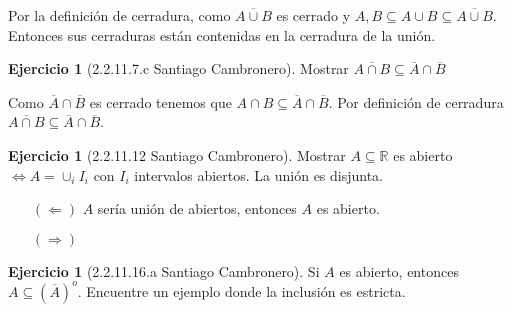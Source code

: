 \documentclass[12pt]{article}
\theoremstyle{plain}
\theoremstyle{definition}
\newtheorem{Ej}[Th]{Ejercicio}
\theoremstyle{remark}
\numberwithin{equation}{section}
\newcommand{\bQ}{\mathbb{Q}}        %
\newcommand{\bR}{\mathbb{R}}        %
\renewcommand{\:}{\colon}           %
\newcommand{\obonj}[1]{\left\rbrack#1\right\lbrack}
\begin{document}
\begin{multicols}{2}
\begin{ptcb}
Por la definición de cerradura, como $\overline{A\cup B}$ es cerrado y $A,B\subseteq A\cup B\subseteq\overline{A\cup B}$. Entonces sus cerraduras están contenidas en la cerradura de la unión.
\end{ptcb}

\begin{Ej}[2.2.11.7.c Santiago Cambronero]
 Mostrar $\overline{A\cap B}\subseteq\overline{A}\cap\overline{B}$
\end{Ej}

\begin{ptcb}
Como $\overline{A}\cap\overline{B}$ es cerrado tenemos que $A\cap B\subseteq \overline{A}\cap\overline{B}$. Por definición de cerradura $\overline{A\cap B}\subseteq\overline{A}\cap\overline{B}$.
\end{ptcb}

\begin{Ej}[2.2.11.12 Santiago Cambronero]
 Mostrar $A\subseteq\bR$ es abierto $\iff A=\cup_i I_i$ con $I_i$ intervalos abiertos. La unión es disjunta.
\end{Ej}

\begin{ptcb}
\begin{enumerate}
  \item[$(\Leftarrow)$] $A$ sería unión de abiertos, entonces $A$ es abierto.
  \item[$(\Rightarrow)$]
\end{enumerate}
\end{ptcb}


\begin{Ej}[2.2.11.16.a Santiago Cambronero]
 Si $A$ es abierto, entonces $A\subseteq(\overline{A})^o$. Encuentre un ejemplo donde la inclusión es estricta.
\end{Ej}


\end{multicols}
\end{document}
